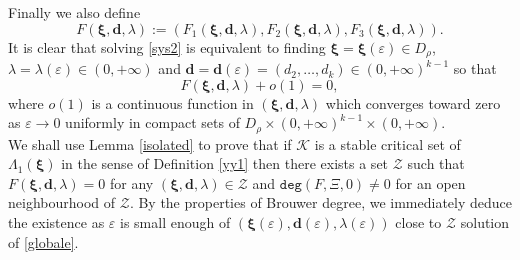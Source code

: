 \documentclass[11pt,a4paper]{amsart}
\theoremstyle{definition}
\renewcommand{\(}{\left(}
\renewcommand{\)}{\right)}
\begin{document}
Finally we also define
$$F(\boldsymbol\xi, \mathbf{d}, \lambda) :=(F_1(\boldsymbol\xi, \mathbf{d}, \lambda) , F_2(\boldsymbol\xi, \mathbf{d}, \lambda), F_3(\boldsymbol\xi, \mathbf{d}, \lambda) ).$$
It is clear that  solving \eqref{sys2} is equivalent to finding   $\boldsymbol\xi=\boldsymbol\xi(\varepsilon) \in D_\rho$,  $\lambda=\lambda(\varepsilon)\in (0, +\infty)$ and  $\mathbf{d}=\mathbf d(\varepsilon)=(d_2, \ldots, d_k)\in (0, +\infty)^{k-1}$ so that
\begin{equation}\label{globale}F(\boldsymbol\xi , \mathbf{d} , \lambda ) +o(1)=0,\end{equation}
where $o(1)$ is a continuous function in $(\boldsymbol\xi, \mathbf{d}, \lambda)$ which converges toward zero as $\varepsilon\to0$ 
uniformly  in compact sets of $D_\rho \times (0, +\infty)^{k-1}\times (0, +\infty).$
\\
We shall use  Lemma \ref{isolated} to prove that if $\mathscr K$ is a stable critical set of $\Lambda_1(\boldsymbol \xi)$ in the sense of Definition \eqref{yy1} then there exists a set $\mathscr Z$ such that
$F(\boldsymbol\xi,\mathbf{d},\lambda)=0$ for any $(\boldsymbol\xi,\mathbf{d},\lambda)\in \mathscr Z$ and 
 $\mathtt{deg}\left(F,\Xi,0\right)\not=0$ for an open neighbourhood of $\mathscr Z$.  By the properties of Brouwer degree, we immediately deduce the existence as $\varepsilon$ is small enough of $(\boldsymbol\xi (\varepsilon),\mathbf{d} (\varepsilon),\lambda (\varepsilon))$  close to $\mathscr Z$
solution of \eqref{globale}.\\
\end{document}
